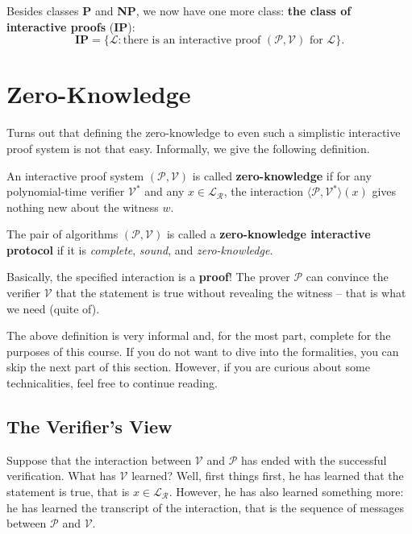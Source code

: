 \documentclass[../lecture-notes.tex]{subfiles}
\begin{document}
\begin{definition}
    Besides classes \textbf{P} and \textbf{NP}, we now have one more class: \textbf{the class of interactive proofs} (\textbf{IP}):
    \begin{equation*}
        \mathbf{IP} = \{\mathcal{L}: \text{there is an interactive proof $(\mathcal{P}, \mathcal{V})$ for $\mathcal{L}$}\}.
    \end{equation*}
\end{definition}

\section{Zero-Knowledge}

Turns out that defining the zero-knowledge to even such a simplistic interactive proof system is not that easy. Informally, we give the following definition.

\begin{definition}
    An interactive proof system $(\mathcal{P}, \mathcal{V})$ is called \textbf{zero-knowledge} if for any polynomial-time verifier $\mathcal{V}^*$ and any $x \in \mathcal{L}_{\mathcal{R}}$, the interaction $\langle \mathcal{P}, \mathcal{V}^* \rangle(x)$ gives nothing new about the witness $w$.
\end{definition}

\begin{definition}
    The pair of algorithms $(\mathcal{P}, \mathcal{V})$ is called a \textbf{zero-knowledge interactive protocol} if it is \textit{complete}, \textit{sound}, and \textit{zero-knowledge}.
\end{definition}

Basically, the specified interaction is a \textbf{proof}! The prover $\mathcal{P}$ can convince the verifier $\mathcal{V}$ that the statement is true without revealing the witness -- that is what we need (quite of).

\begin{remark}
    The above definition is very informal and, for the most part, complete for the purposes of this course. If you do not want to dive into the formalities, you can skip the next part of this section. However, if you are curious about some technicalities, feel free to continue reading.
\end{remark}

\subsection{The Verifier's View}
Suppose that the interaction between $\mathcal{V}$ and $\mathcal{P}$ has ended with the successful verification. What has $\mathcal{V}$ learned? Well, first things first, he has learned that the statement is true, that is $x \in \mathcal{L}_{\mathcal{R}}$. However, he has also learned something more: he has learned the transcript of the interaction, that is the sequence of messages between $\mathcal{P}$ and $\mathcal{V}$.
\end{document}
